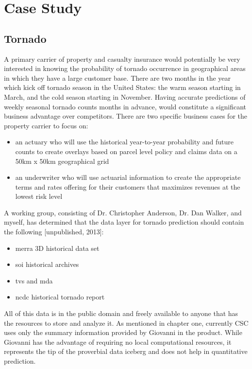 

\chapter{Case Study}
\section*{Tornado}
A primary carrier of property and casualty insurance would potentially be very interested in knowing the probability of tornado occurrence in geographical areas in which they have a large customer base. There are two months in the year which kick off tornado season in the United States: the warm season starting in March, and the cold season starting in November. Having accurate predictions of weekly seasonal tornado counts months in advance, would constitute a significant business advantage over competitors. There are two specific business cases for the property carrier to focus on:
\begin{itemize}
    \item an actuary who will use the historical year-to-year probability and future counts to create overlays based on parcel level policy and claims data on a 50km x 50km geographical grid
    \item an underwriter who will use actuarial information to create the appropriate terms and rates offering for their customers that maximizes revenues at the lowest risk level
\end{itemize}
A working group, consisting of Dr. Christopher Anderson, Dr. Dan Walker, and myself, has determined that the data layer for tornado prediction should contain the following [unpublished, 2013]:
\begin{itemize}
    \item \gls{merra} 3D historical data set\cite{mdisc}
    \item \gls{soi} historical archives\cite{bom}
    \item \gls{tvs} and \gls{mda}\cite{hdss} 
    \item \gls{ncdc} historical tornado report\cite{ncdc}
\end{itemize}
All of this data is in the public domain and freely available to anyone that has the resources to store and analyze it. As mentioned in chapter one, currently CSC uses only the summary information provided by Giovanni in the \climatedge product. While Giovanni has the advantage of requiring no local computational resources, it represents the tip of the proverbial data iceberg and does not help in quantitative prediction.\\


